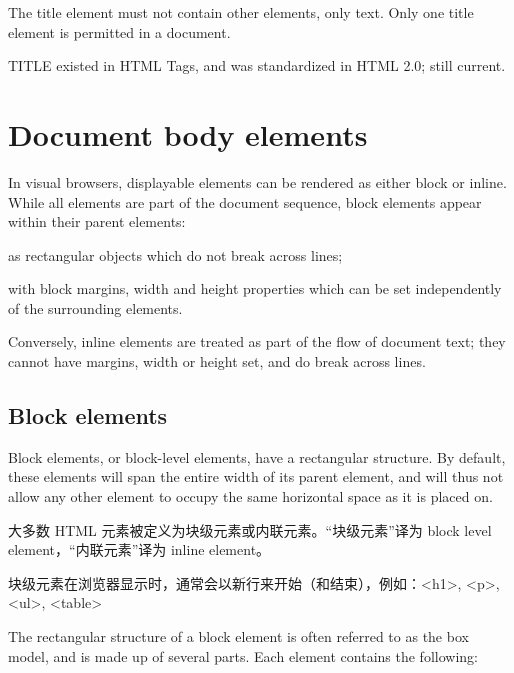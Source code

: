 The title element must not contain other elements, only text. Only one title element is permitted in a document.

TITLE existed in HTML Tags, and was standardized in HTML 2.0; still current.




\chapter{Document body elements}


In visual browsers, displayable elements can be rendered as either block or inline. While all elements are part of the document sequence, block elements appear within their parent elements:

\begin{compactitem}
\item as rectangular objects which do not break across lines;
\item with block margins, width and height properties which can be set independently of the surrounding elements.
\end{compactitem}

Conversely, inline elements are treated as part of the flow of document text; they cannot have margins, width or height set, and do break across lines.


\section{Block elements}

Block elements, or block-level elements, have a rectangular structure. By default, these elements will span the entire width of its parent element, and will thus not allow any other element to occupy the same horizontal space as it is placed on.

大多数 HTML 元素被定义为块级元素或内联元素。“块级元素”译为 block level element，“内联元素”译为 inline element。

块级元素在浏览器显示时，通常会以新行来开始（和结束），例如：<h1>, <p>, <ul>, <table>



The rectangular structure of a block element is often referred to as the box model, and is made up of several parts. Each element contains the following:

